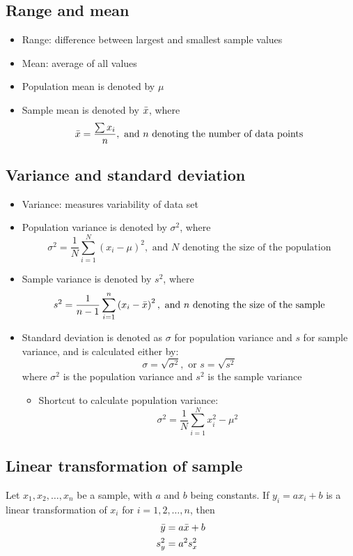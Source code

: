\documentclass[a4paper]{article}
\begin{document}
\subsection{Range and mean}
\begin{itemize}
    \item Range: difference between largest and smallest sample values
    \item Mean: average of all values
    \newline
    \item Population mean is denoted by $\mu$
    \item Sample mean is denoted by $\Bar{x}$, where $$\Bar{x} = \frac{\sum x_{i}}{n}, \text{ and $n$ denoting the number of data points}$$
\end{itemize}
\subsection{Variance and standard deviation}
\begin{itemize}
    \item Variance: measures variability of data set
    \item Population variance is denoted by $\sigma^2$, where
    $$\sigma^2 = \frac{1}{N}\sum_{i=1}^{N}\left(x_{i}-\mu\right)^{2}, \text{ and $N$ denoting the size of the population}$$
    \item Sample variance is denoted by $s^2$, where
    $$s^2 = \frac{1}{n-1}\sum_{i=1}^{n}\left(x_{i}-\Bar{x}\right)^2, \text{ and $n$ denoting the size of the sample}$$
    \newline
    \item Standard deviation is denoted as $\sigma$ for population variance and $s$ for sample variance, and is calculated either by:
    $$\sigma = \sqrt{\sigma^2}, \text{ or } s = \sqrt{s^2}$$
    where $\sigma^2$ is the population variance and $s^2$ is the sample variance
    \begin{itemize}[label=$\circ$]
        \item Shortcut to calculate population variance:
        $$\sigma^2 = \frac{1}{N}\sum_{i=1}^{N}x_{i}^{2}-\mu^2$$
    \end{itemize}
\end{itemize}
\subsection{Linear transformation of sample}
Let $x_{1}, x_{2}, \ldots, x_{n}$ be a sample, with $a$ and $b$ being constants. If $y_{i} = ax_{i}+b$ is a linear transformation of $x_{i}$ for $i = 1, 2, \ldots, n$, then 
\begin{align*}
    \Bar{y} &= a\Bar{x}+b\\
    s_{y}^2 &= a^{2}s_{x}^{2}
\end{align*}
\end{document}

